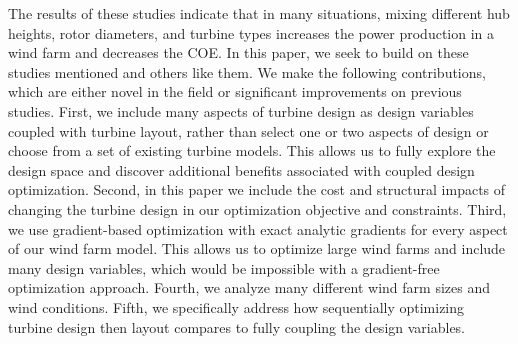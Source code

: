 The results of these studies indicate that in many situations, mixing different hub heights, rotor diameters, and turbine types increases the power production in a wind farm and decreases the COE. In this paper, we seek to build on these studies mentioned and others like them.
We make the following contributions, which are either novel in the field or significant improvements on previous studies.
First, we include many aspects of turbine design as design variables coupled with turbine layout, rather than select one or two aspects of design or choose from a set of existing turbine models. This allows us to fully explore the design space and discover additional benefits associated with coupled design optimization.
Second, in this paper we include the cost and structural impacts of changing the turbine design in our optimization objective and constraints.
Third, we use gradient-based optimization with exact analytic gradients for every aspect of our wind farm model. This allows us to optimize large wind farms and include many design variables, which would be impossible with a gradient-free optimization approach.
Fourth, we analyze many different wind farm sizes and wind conditions.
Fifth, we specifically address how sequentially optimizing turbine design then layout compares to fully coupling the design variables.



